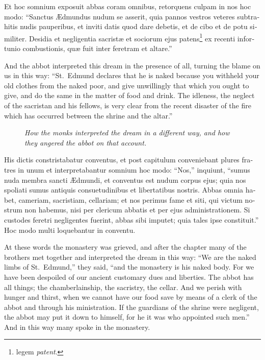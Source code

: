 \documentclass[10pt]{book}
\newcommand{\blockhead}[4][]{
\begin{figure}
\centering
\vspace{#4}
\parbox{2.75cm}{\begin{center}\footnotesize \color{BrickRed} \emph{#2}\\ #1 \end{center}}
\end{figure}
}
\begin{document}
\begin{paracol}{2}
\switchcolumn*

\begin{otherlanguage}{latin}
Et hoc somnium exposuit abbas coram omnibus, retorquens culpam in nos hoc modo: ``Sanctus \AE{}dmundus nudum se asserit, quia pannos vestros veteres subtrahitis nudis pauperibus, et inviti datis quod dare debetis, et de cibo et de potu similiter. Desidia et negligentia sacrist\ae{} et sociorum ejus patens\footnote[\textdagger]{legem \emph{patent}.} ex recenti infortunio combustionis, qu\ae{} fuit inter feretram et altare.''
\end{otherlanguage}

\switchcolumn

And the abbot interpreted this dream in the presence of all, turning the blame on us in this way: ``St.\ Edmund declares that he is naked because you withheld your old clothes from the naked poor, and give unwillingly that which you ought to give, and do the same in the matter of food and drink. The idleness, the neglect of the sacristan and his fellows, is very clear from the recent disaster of the fire which has occurred between the shrine and the altar.''

\switchcolumn*

\begin{otherlanguage}{latin}
\blockhead{How the monks interpreted the dream in a different way, and how they angered the abbot on that account.}{4}{-.65cm}
His dictis constristabatur conventus, et post capitulum conveniebant plures fratres in unum et interpretabantur somnium hoc modo: ``Nos,'' inquiunt, ``sumus nuda membra sancti \AE{}dmundi, et conventus est nudum corpus ejus; quia nos spoliati sumus antiquis consuetudinibus et libertatibus nostris. Abbas omnia habet, cameriam, sacristiam, cellariam; et nos perimus fame et siti, qui victum nostrum non habemus, nisi per clericum abbatis et per ejus administrationem. Si custodes feretri negligentes fuerint, abbas sibi imputet; quia tales ipse constituit.'' Hoc modo multi loquebantur in conventu.

\end{otherlanguage}

\switchcolumn

At these words the monastery was grieved, and after the chapter many of the brothers met together and interpreted the dream in this way: ``We are the naked limbs of St.\ Edmund,'' they said, ``and the monastery is his naked body. For we have been despoiled of our ancient customary dues and liberties. The abbot has all things; the chamberlainship, the sacristry, the cellar. And we perish with hunger and thirst, when we cannot have our food save by means of a clerk of the abbot and through his ministration. If the guardians of the shrine were negligent, the abbot may put it down to himself, for he it was who appointed such men.'' And in this way many spoke in the monastery.


\end{paracol}
\end{document}

